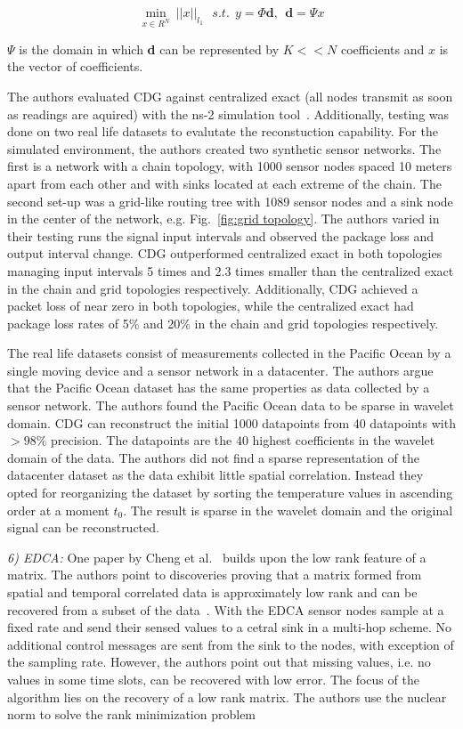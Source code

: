 $$
\displaystyle{\min_{x\in R^N} \ ||x||_{l_1}}  \ \ \   s.t.  \ \  y = \Phi \textbf{d} , \ \ 
\textbf{d}  = \Psi x
$$

$ \Psi $ is the domain in which \textbf{d} can be represented by $ K << N
$ coefficients and $ x $ is the vector of coefficients.

The authors evaluated \ac{CDG} against centralized exact (all nodes transmit as
soon as readings are aquired) with the ns-2 simulation
tool~\cite{bajaj1999improving}. Additionally, testing was done on two real life
datasets to evalutate the reconstuction capability. For the simulated
environment, the authors created two synthetic sensor networks. The first is a
network with a chain topology, with 1000 sensor nodes spaced 10 meters apart
from each other and with sinks located at each extreme of the chain. The second
set-up was a grid-like routing tree with 1089 sensor nodes and a sink node in
the center of the network, e.g. Fig.~\ref{fig:grid topology}. The authors
varied in their testing runs the signal input intervals and observed the
package loss and output interval change. \ac{CDG} outperformed centralized
exact in both topologies managing input intervals 5 times and 2.3 times smaller
than the centralized exact in the chain and grid topologies respectively.
Additionally, \ac{CDG} achieved a packet loss of near zero in both topologies,
while the centralized exact had package loss rates of 5\% and 20\% in the chain
and grid topologies respectively.

The real life datasets consist of measurements collected in the Pacific Ocean
by a single moving device and a sensor network in a datacenter. The authors
argue that the Pacific Ocean dataset has the same properties as data collected
by a sensor network. The authors found the Pacific Ocean data to be sparse in
wavelet domain. \ac{CDG} can reconstruct the initial 1000 datapoints from 40
datapoints with $ > 98\% $ precision. The datapoints are the 40 highest
coefficients in the wavelet domain of the data. The authors did not find a
sparse representation of the datacenter dataset as the data exhibit little
spatial correlation. Instead they opted for reorganizing the dataset by sorting
the temperature values in ascending order at a moment $ t_0 $. The result is
sparse in the wavelet domain and the original signal can be reconstructed.
\par
\textit{6) \ac{EDCA}:}
One paper by Cheng et al.~\cite{cheng2010efficient} builds upon the low rank
feature of a matrix. The authors point to discoveries proving that a matrix
formed from spatial and temporal correlated data is approximately low rank and
can be recovered from a subset of the data~\cite{vuran2004spatio,
candes2009exact}. With the \ac{EDCA} sensor nodes sample at a fixed rate and
send their sensed values to a cetral sink in a multi-hop scheme. No additional
control messages are sent from the sink to the nodes, with exception of the
sampling rate. However, the authors point out that missing values, i.e. no
values in some time slots, can be recovered with low error. The focus of the
algorithm lies on the recovery of a low rank matrix. The authors use the
nuclear norm to solve the rank minimization problem

